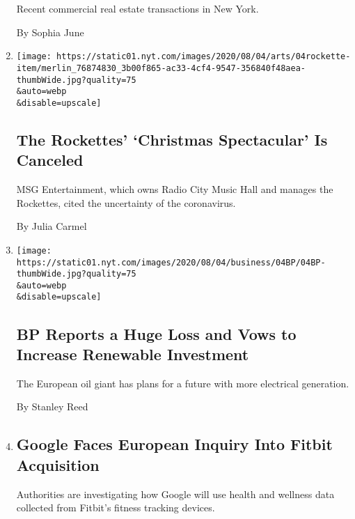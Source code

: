 \begin{enumerate}
  Recent commercial real estate transactions in New York.

  By Sophia June
\item
  \href{/2020/08/04/theater/radio-city-rockettes-christmas-canceled.html}{}

  \texttt{[image: https://static01.nyt.com/images/2020/08/04/arts/04rockette-item/merlin\_76874830\_3b00f865-ac33-4cf4-9547-356840f48aea-thumbWide.jpg?quality=75\\\&auto=webp\\\&disable=upscale]}

  \hypertarget{the-rockettes-christmas-spectacular-is-canceled}{%
  \subsection{The Rockettes' `Christmas Spectacular' Is
  Canceled}\label{the-rockettes-christmas-spectacular-is-canceled}}

  MSG Entertainment, which owns Radio City Music Hall and manages the
  Rockettes, cited the uncertainty of the coronavirus.

  By Julia Carmel
\item
  \href{/2020/08/04/business/energy-environment/bp-renewable-investment.html}{}

  \texttt{[image: https://static01.nyt.com/images/2020/08/04/business/04BP/04BP-thumbWide.jpg?quality=75\\\&auto=webp\\\&disable=upscale]}

  \hypertarget{bp-reports-a-huge-loss-and-vows-to-increase-renewable-investment}{%
  \subsection{BP Reports a Huge Loss and Vows to Increase Renewable
  Investment}\label{bp-reports-a-huge-loss-and-vows-to-increase-renewable-investment}}

  The European oil giant has plans for a future with more electrical
  generation.

  By Stanley Reed
\item
  \href{/2020/08/04/business/google-fitbit-europe.html}{}

  \hypertarget{google-faces-european-inquiry-into-fitbit-acquisition}{%
  \subsection{Google Faces European Inquiry Into Fitbit
  Acquisition}\label{google-faces-european-inquiry-into-fitbit-acquisition}}

  Authorities are investigating how Google will use health and wellness
  data collected from Fitbit's fitness tracking devices.


\end{enumerate}
